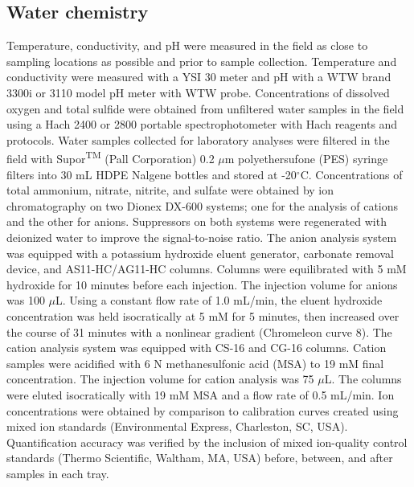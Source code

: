 \subsection{Water chemistry} Temperature, conductivity, and pH were measured in the field as close to sampling locations as possible and prior to sample collection. Temperature and conductivity were measured with a YSI 30 meter and pH with a WTW brand 3300i or 3110 model pH meter with WTW probe. Concentrations of dissolved oxygen and total sulfide were obtained from unfiltered water samples in the field using a Hach 2400 or 2800 portable spectrophotometer with Hach reagents and protocols. Water samples collected for laboratory analyses were filtered in the field with Supor\textsuperscript{TM} (Pall Corporation) 0.2 $\mu$m polyethersufone (PES) syringe filters into 30 mL HDPE Nalgene bottles and stored at -20$^{\circ}$C. Concentrations of total ammonium, nitrate, nitrite, and sulfate were obtained by ion chromatography on two Dionex DX-600 systems; one for the analysis of cations and the other for anions. Suppressors on both systems were regenerated with deionized water to improve the signal-to-noise ratio. The anion analysis system was equipped with a potassium hydroxide eluent generator, carbonate removal device, and AS11-HC/AG11-HC columns. Columns were equilibrated with 5 mM hydroxide for 10 minutes before each injection. The injection volume for anions was 100 $\mu$L. Using a constant flow rate of 1.0 mL/min, the eluent hydroxide concentration was held isocratically at 5 mM for 5 minutes, then increased over the course of 31 minutes with a nonlinear gradient (Chromeleon curve 8). The cation analysis system was equipped with CS-16 and CG-16 columns. Cation samples were acidified with 6 N methanesulfonic acid (MSA) to 19 mM final concentration. The injection volume for cation analysis was 75 $\mu$L. The columns were eluted isocratically with 19 mM MSA and a flow rate of 0.5 mL/min. Ion concentrations were obtained by comparison to calibration curves created using mixed ion standards (Environmental Express, Charleston, SC, USA). Quantification accuracy was verified by the inclusion of mixed ion-quality control standards (Thermo Scientific, Waltham, MA, USA) before, between, and after samples in each tray.

